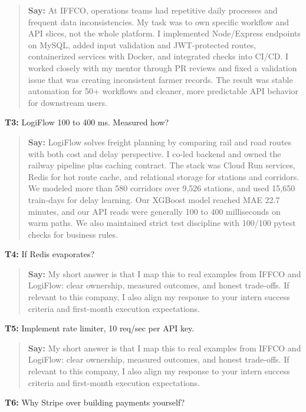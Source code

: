 \documentclass[9pt,a4paper]{article}
\begin{document}
\begin{quote}\small\textbf{Say:} At IFFCO, operations teams had repetitive daily processes and frequent data inconsistencies. My task was to own specific workflow and API slices, not the whole platform. I implemented Node/Express endpoints on MySQL, added input validation and JWT-protected routes, containerized services with Docker, and integrated checks into CI/CD. I worked closely with my mentor through PR reviews and fixed a validation issue that was creating inconsistent farmer records. The result was stable automation for 50+ workflows and cleaner, more predictable API behavior for downstream users.\end{quote}
\vspace{2mm}
\textbf{T3:} LogiFlow 100 to 400 ms. Measured how?

\begin{quote}\small\textbf{Say:} LogiFlow solves freight planning by comparing rail and road routes with both cost and delay perspective. I co-led backend and owned the railway pipeline plus caching contract. The stack was Cloud Run services, Redis for hot route cache, and relational storage for stations and corridors. We modeled more than 580 corridors over 9,526 stations, and used 15,650 train-days for delay learning. Our XGBoost model reached MAE 22.7 minutes, and our API reads were generally 100 to 400 milliseconds on warm paths. We also maintained strict test discipline with 100/100 pytest checks for business rules.\end{quote}
\vspace{2mm}
\textbf{T4:} If Redis evaporates?

\begin{quote}\small\textbf{Say:} My short answer is that I map this to real examples from IFFCO and LogiFlow: clear ownership, measured outcomes, and honest trade-offs. If relevant to this company, I also align my response to your intern success criteria and first-month execution expectations.\end{quote}
\vspace{2mm}
\textbf{T5:} Implement rate limiter, 10 req/sec per API key.

\begin{quote}\small\textbf{Say:} My short answer is that I map this to real examples from IFFCO and LogiFlow: clear ownership, measured outcomes, and honest trade-offs. If relevant to this company, I also align my response to your intern success criteria and first-month execution expectations.\end{quote}
\vspace{2mm}
\textbf{T6:} Why Stripe over building payments yourself?
\end{document}
